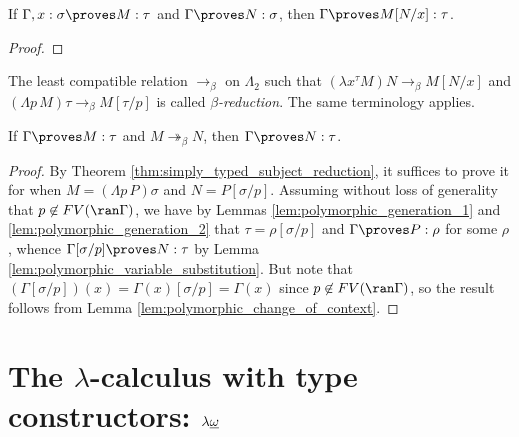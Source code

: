 \documentclass[reqno]{amsart}
\begin{document}
    \begin{lemma}\label{lem:polymorphic_substitution}
        If $\Gamma,x:\sigma\proves M:\tau$ and $\Gamma\proves N:\sigma$, then $\Gamma\proves M[N/x]:\tau$.
    \end{lemma}
    \begin{proof}
        \TODO
    \end{proof}

    \begin{definition}
        The least compatible relation $\rightarrow_\beta$ on $\Lambda_2$ such that $(\lambda x^\tau M)N\rightarrow_\beta M[N/x]$ and $(\Lambda p\,M)\tau\rightarrow_\beta M[\tau/p]$ is called \textit{$\beta$-reduction}. The same terminology applies.
    \end{definition}

    \begin{theorem}\label{thm:polymorphic_subject_reduction}
        If $\Gamma\proves M:\tau$ and $M\twoheadrightarrow_\beta N$, then $\Gamma\proves N:\tau$.
    \end{theorem}
    \begin{proof}
        By Theorem \ref{thm:simply_typed_subject_reduction}, it suffices to prove it for when $M=(\Lambda p\,P)\sigma$ and $N=P[\sigma/p]$. Assuming without loss of generality that $p\not\in FV(\ran\Gamma)$, we have by Lemmas \ref{lem:polymorphic_generation_1} and \ref{lem:polymorphic_generation_2} that $\tau=\rho[\sigma/p]$ and $\Gamma\proves P:\rho$ for some $\rho$, whence $\Gamma[\sigma/p]\proves N:\tau$ by Lemma \ref{lem:polymorphic_variable_substitution}. But note that $(\Gamma[\sigma/p])(x)=\Gamma(x)[\sigma/p]=\Gamma(x)$ since $p\not\in FV(\ran\Gamma)$, so the result follows from Lemma \ref{lem:polymorphic_change_of_context}. 
    \end{proof}

    \section{The $\lambda$-calculus with type constructors: $\lambda\uline{\omega}$}

    \begin{definition}
        
    \end{definition}

    \begin{lemma}
        
    \end{lemma}
\end{document}

